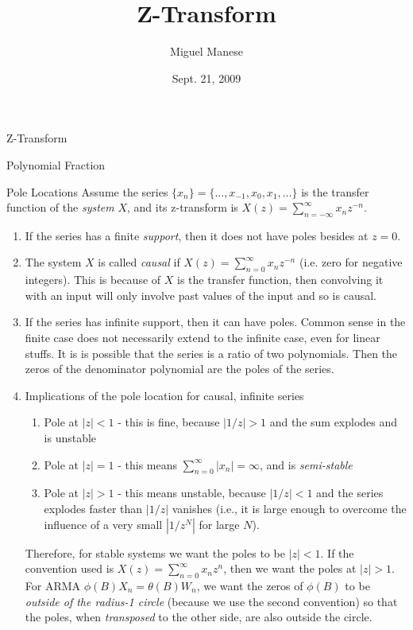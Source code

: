\documentclass{article}
\title{Z-Transform}
\author{Miguel Manese}
\date{Sept. 21, 2009}
\begin{document}
\maketitle

\begin{section}{Z-Transform}
\end{section}

\begin{section}{Polynomial Fraction}
\end{section}

\begin{section}{Pole Locations}
Assume the series $\{x_{n}\} = \{\ldots, x_{-1}, x_{0}, x_{1}, \ldots\}$ 
is the transfer function of the \emph{system} $X$, and its z-transform is 
$X(z) = \sum_{n=-\infty}^{\infty} x_{n} z^{-n}$.
\begin{enumerate}
\item If the series has a finite \emph{support}, then it does not have poles
besides at $z = 0$.
\item The system $X$ is called \emph{causal} if 
$X(z) = \sum_{n=0}^{\infty} x_{n} z^{-n}$ (i.e. zero for negative integers). 
This is because of $X$ is the transfer function, then convolving it with
an input will only involve past values of the input and so is causal.
\item If the series has infinite support, then it can have poles. Common
sense in the finite case does not necessarily extend to the infinite case,
even for linear stuffs. It is is possible that the series is a 
ratio of two polynomials. Then the zeros of the denominator polynomial
are the poles of the series.
\item Implications of the pole location for causal, infinite series
  \begin{enumerate}
  \item Pole at $|z| < 1$ - this is fine, because $|1/z| > 1$ and the sum
  explodes and is unstable
  \item Pole at $|z| = 1$ - this means $\sum_{n=0}^{\infty} |x_{n}| = \infty$,
  and is \emph{semi-stable}
  \item Pole at $|z| > 1$ - this means unstable, because $|1/z| < 1$ and
  the series explodes faster than $|1/z|$ vanishes (i.e., it is large enough
  to overcome the influence of a very small $|1/z^{N}|$ for large $N$).
  \end{enumerate}
\noindent Therefore, for stable systems we want the poles to be $|z| < 1$. 
If the convention used is $X(z) = \sum_{n=0}^{\infty} x_{n} z^{n}$, then
we want the poles at $|z| > 1$.\\
For ARMA $\phi(B)X_{n} = \theta(B)W_{n}$, we want the zeros of $\phi(B)$ to
be \emph{outside of the radius-1 circle} (because we use the second convention)
so that the poles, when \emph{transposed} to the other side, are also
outside the circle.
\end{enumerate}
\end{section}
\end{document}
